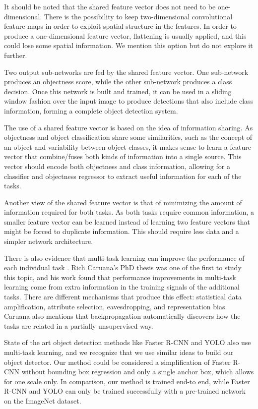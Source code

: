 It should be noted that the shared feature vector does not need to be one-dimensional. There is the possibility to keep two-dimensional convolutional feature maps in order to exploit spatial structure in the features. In order to produce a one-dimensional feature vector, flattening is usually applied, and this could lose some spatial information. We mention this option but do not explore it further.

Two output sub-networks are fed by the shared feature vector. One sub-network produces an objectness score, while the other sub-network produces a class decision. Once this network is built and trained, it can be used in a sliding window fashion over the input image to produce detections that also include class information, forming a complete object detection system.

The use of a shared feature vector is based on the idea of information sharing. As objectness and object classification share some similarities, such as the concept of an object and variability between object classes, it makes sense to learn a feature vector that combine/fuses both kinds of information into a single source.  This vector should encode both objectness and class information, allowing for a classifier and objectness regressor to extract useful information for each of the tasks.

Another view of the shared feature vector is that of minimizing the amount of information required for both tasks. As both tasks require common information, a smaller feature vector can be learned instead of learning two feature vectors that might be forced to duplicate information. This should require less data and a simpler network architecture.

There is also evidence \cite{caruana1997multitaskJournalML} that multi-task learning can improve the performance of each individual task . Rich Caruana's PhD thesis \cite{caruana1997multitask} was one of the first to study this topic, and his work found that performance improvements in multi-task learning come from extra information in the training signals of the additional tasks. There are different mechanisms that produce this effect: statistical data amplification, attribute selection, eavesdropping, and representation bias. Caruana also mentions that backpropagation automatically discovers how the tasks are related in a partially unsupervised way.

\newpage
State of the art object detection methods like Faster R-CNN \cite{ren2015faster} and YOLO \cite[1em]{redmon2016you} also use multi-task learning, and we recognize that we use similar ideas to build our object detector.
Our method could be considered a simplification of Faster R-CNN without bounding box regression and only a single anchor box, which allows for one scale only. In comparison, our method is trained end-to end, while Faster R-CNN and YOLO can only be trained successfully with a pre-trained network on the ImageNet dataset.

